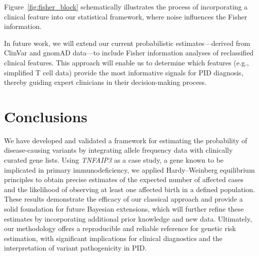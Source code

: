 \documentclass[a4paper,12pt]{article}
\begin{document}
Figure~\ref{fig:fisher_block} schematically illustrates the process of incorporating a clinical feature into our statistical framework, where noise influences the Fisher information.

\begin{center}
\end{center}
\label{fig:fisher_block}

In future work, we will extend our current probabilistic estimates—derived from ClinVar and gnomAD data—to include Fisher information analyses of reclassified clinical features. This approach will enable us to determine which features (e.g., simplified T cell data) provide the most informative signals for PID diagnosis, thereby guiding expert clinicians in their decision-making process.


\section{Conclusions}
We have developed and validated a framework for estimating the probability of disease-causing variants by integrating allele frequency data with clinically curated gene lists. Using \textit{TNFAIP3} as a case study, a gene known to be implicated in primary immunodeficiency, we applied Hardy–Weinberg equilibrium principles to obtain precise estimates of the expected number of affected cases and the likelihood of observing at least one affected birth in a defined population. These results demonstrate the efficacy of our classical approach and provide a solid foundation for future Bayesian extensions, which will further refine these estimates by incorporating additional prior knowledge and new data. Ultimately, our methodology offers a reproducible and reliable reference for genetic risk estimation, with significant implications for clinical diagnostics and the interpretation of variant pathogenicity in PID.
\end{document}
